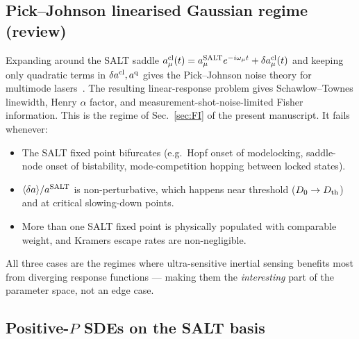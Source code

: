 \documentclass[11pt]{article}
\begin{document}
\subsection{Pick--Johnson linearised Gaussian regime (review)}

Expanding around the SALT saddle
$a_\mu^{\rm cl}(t) = a_\mu^{\rm SALT}e^{-i\omega_\mu t}
+ \delta a_\mu^{\rm cl}(t)$ and keeping only quadratic terms in
$\delta a^{\rm cl}, a^{\rm q}$ gives the Pick--Johnson noise theory for
multimode lasers~\cite{Pick2015}.  The resulting linear-response problem
gives Schawlow--Townes linewidth, Henry $\alpha$ factor, and
measurement-shot-noise-limited Fisher information.  This is the regime
of Sec.~\ref{sec:FI} of the present manuscript.  It fails whenever:
\begin{itemize}\itemsep0em
\item The SALT fixed point bifurcates (e.g.\ Hopf onset of modelocking,
  saddle-node onset of bistability, mode-competition hopping between
  locked states).
\item $\langle\delta a\rangle / a^{\rm SALT}$ is non-perturbative, which
  happens near threshold ($D_0 \to D_{\rm th}$) and at critical
  slowing-down points.
\item More than one SALT fixed point is physically populated with
  comparable weight, and Kramers escape rates are non-negligible.
\end{itemize}
All three cases are the regimes where ultra-sensitive inertial sensing
benefits most from diverging response functions --- making them the
\emph{interesting} part of the parameter space, not an edge case.

\subsection{Positive-$P$ SDEs on the SALT basis}
\label{sec:salt_positiveP}
\end{document}
